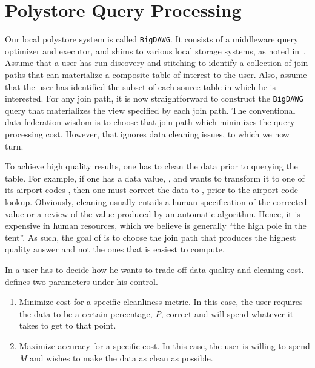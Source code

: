 \section{Polystore Query Processing}
\label{sec:curating}

Our local polystore system is called \texttt{BigDAWG}. It consists of a middleware query optimizer and executor, and shims to various local storage systems, as noted in~\cite{DBLP:journals/sigmod/DugganESBHKMMMZ15,DBLP:journals/pvldb/ElmoreDSBCGHHKK15}. Assume that a user has run discovery and stitching to identify a collection of join paths that can materialize a composite table of interest to the user.  Also, assume that the user has identified the subset of each source table in which he is interested. For any join path, it is now straightforward to construct the \texttt{BigDAWG} query that materializes the view specified by each join path. The conventional data federation wisdom is to choose that join path which minimizes the query processing cost. However, that ignores data cleaning issues, to which we now turn.



To achieve high quality results, one has to clean the data prior to querying the table. For example, if one has a data value, , and wants to transform it to one of its airport codes , then one must correct the data to , prior to the airport code lookup. Obviously, cleaning usually entails a human specification of the corrected value or a review of the value produced by an automatic algorithm. Hence, it is expensive in human resources, which we believe is generally ``the high pole in the tent''. As such, the goal of \dcv is to choose the join path that produces the highest quality answer and not the ones that is easiest to compute.



In \dcv a user has to decide how he wants to trade off data quality and cleaning cost. \dcv defines two parameters under his control.

\begin{enumerate}
\item Minimize cost for a specific cleanliness metric. In this case, the user requires the data to be a certain percentage, \emph{P}, correct and will spend whatever it takes to get to that point.

\item Maximize accuracy for a specific cost. In this case, the user is willing to spend \emph{M} and wishes to make the data as clean as possible.
\end{enumerate}


